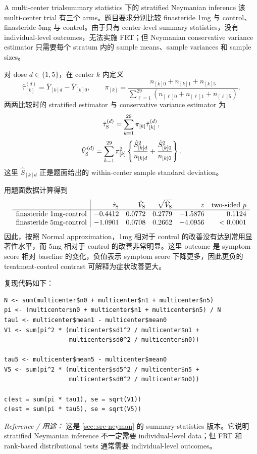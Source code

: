 \begin{exercisesolution}{A multi-center trial}{summary statistics 下的 stratified Neymanian inference}
该 multi-center trial 有三个 arms。题目要求分别比较 finasteride 1mg 与 control、finasteride 5mg 与 control。由于只有 center-level summary statistics，没有 individual-level outcomes，无法实施 FRT；但 Neymanian conservative variance estimator 只需要每个 stratum 内的 sample means、sample variances 和 sample sizes。

对 dose $d\in\{1,5\}$，在 center $k$ 内定义
\[
\hat\tau_{[k]}^{(d)}=\bar Y_{[k]d}-\bar Y_{[k]0},
\qquad
\pi_{[k]}=\frac{n_{[k]0}+n_{[k]1}+n_{[k]5}}
{\sum_{\ell=1}^{29}(n_{[\ell]0}+n_{[\ell]1}+n_{[\ell]5})}.
\]
两两比较时的 stratified estimator 与 conservative variance estimator 为
\[
\hat\tau_{\textsc{S}}^{(d)}
=\sum_{k=1}^{29}\pi_{[k]}\hat\tau_{[k]}^{(d)},
\]
\[
\hat V_{\textsc{S}}^{(d)}
=
\sum_{k=1}^{29}\pi_{[k]}^2
\left\{
\frac{\hat S_{[k]d}^2}{n_{[k]d}}
+\frac{\hat S_{[k]0}^2}{n_{[k]0}}
\right\}.
\]
这里 $\hat S_{[k]d}$ 正是题面给出的 within-center sample standard deviation。

用题面数据计算得到
\[
\begin{array}{c|rrrrr}
&\hat\tau_{\textsc{S}}&\hat V_{\textsc{S}}&
\sqrt{\hat V_{\textsc{S}}}&z&\text{two-sided }p\\ \hline
\text{finasteride 1mg-control}&-0.4412&0.0772&0.2779&-1.5876&0.1124\\
\text{finasteride 5mg-control}&-1.0901&0.0708&0.2662&-4.0956&<0.0001
\end{array}
\]
因此，按照 Normal approximation，1mg 相对于 control 的改善没有达到常用显著性水平，而 5mg 相对于 control 的改善非常明显。这里 outcome 是 symptom score 相对 baseline 的变化，负值表示 symptom score 下降更多，因此更负的 treatment-control contrast 可解释为症状改善更大。

复现代码如下：
\begin{lstlisting}
N <- sum(multicenter$n0 + multicenter$n1 + multicenter$n5)
pi <- (multicenter$n0 + multicenter$n1 + multicenter$n5) / N
tau1 <- multicenter$mean1 - multicenter$mean0
V1 <- sum(pi^2 * (multicenter$sd1^2 / multicenter$n1 +
                  multicenter$sd0^2 / multicenter$n0))

tau5 <- multicenter$mean5 - multicenter$mean0
V5 <- sum(pi^2 * (multicenter$sd5^2 / multicenter$n5 +
                  multicenter$sd0^2 / multicenter$n0))

c(est = sum(pi * tau1), se = sqrt(V1))
c(est = sum(pi * tau5), se = sqrt(V5))
\end{lstlisting}

\emph{Reference / 用途：} 这是 \cref{sec::sre-neyman} 的 summary-statistics 版本。它说明 stratified Neymanian inference 不一定需要 individual-level data；但 FRT 和 rank-based distributional tests 通常需要 individual-level outcomes。
\end{exercisesolution}

